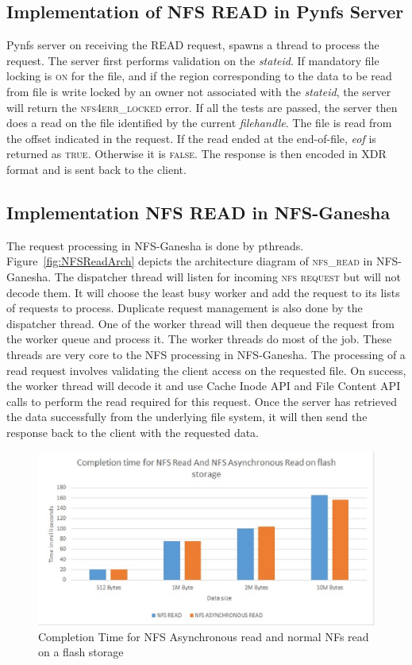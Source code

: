 \subsection{Implementation of NFS READ in Pynfs Server}
Pynfs server on receiving the READ request, spawns a thread to process the request. The server first performs validation on the \textit{stateid}. If mandatory file locking is \textsc{on} for the file, and if the region corresponding to the data to be read from file is write locked by an owner not associated with the \textit{stateid}, the server will return the \textsc{nfs4err\_locked} error. If all the tests are passed, the server then does a read on the file identified by the current \textit{filehandle}. The file is read from the offset indicated in the request.  If the read ended at the end-of-file, \textit{eof} is returned as  \textsc{true}. Otherwise it is \textsc{false}. The response is then encoded in XDR format and is sent back to the client.
	
\subsection{Implementation NFS READ in NFS-Ganesha}

 The request processing in NFS-Ganesha is done by pthreads. Figure~\ref{fig:NFSReadArch} depicts the architecture diagram of \textsc{nfs\_read} in NFS-Ganesha. The dispatcher thread will listen for incoming \textsc{nfs request} but will not decode them. It will choose the least busy worker and add the request to its lists of requests to process. Duplicate request management is also done by the dispatcher thread. One of the worker thread will then dequeue the request from the worker queue and process it. The worker threads do most of the job. These threads are very core to the NFS processing in NFS-Ganesha. The processing of a read request involves validating the client access on the requested file. On success, the worker thread will decode it and use Cache Inode API and File Content API calls to perform the read required for this request. Once the server has retrieved the data successfully from the underlying file system, it will then send the response back to the client with the requested data.
  
\begin{figure}
\centering
\includegraphics[scale=1.0]{figures/completion_time.eps}
\caption{Completion	Time for NFS Asynchronous read and normal NFs read on a flash storage}
\label{fig:NFSCompletionTimes}
\end{figure}  

